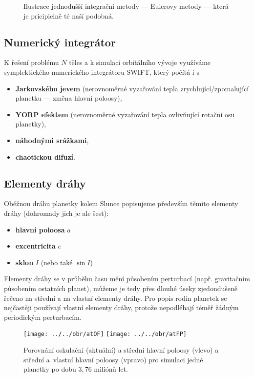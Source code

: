 \documentclass[a4paper, 12pt]{article}
\begin{document}
\begin{figure}
\begin{subfigure}[b]{0.45\textwidth}
	\end{subfigure}
	\caption{Ilustrace jednodušší integrační metody --- Eulerovy metody --- která je pricipielně té naší podobná.}
\end{figure}
\vspace{-1cm}
\subsection{Numerický integrátor}

K řešení problému $N$ těles a k simulaci orbitálního vývoje využíváme symplektického numerického integrátoru SWIFT, který počítá i s 

\begin{itemize}
\itemsep0em
\item \textbf{Jarkovského jevem} (nerovnoměrné vyzařování tepla zrychlující/zpomalující planetku --- změna hlavní poloosy),
\item \textbf{YORP efektem} (nerovnoměrné vyzařování tepla ovlivňující rotační osu planetky),
\item \textbf{náhodnými srážkami},
\item \textbf{chaotickou difuzí}.  
\end{itemize}

\subsection{Elementy dráhy}
Oběžnou dráhu planetky kolem Slunce popisujeme především těmito elementy dráhy (dohromady jich je ale šest):
\begin{itemize}
	\itemsep0em
	\item \textbf{hlavní poloosa} $a$
	\item \textbf{excentricita} $e$
	\item \textbf{sklon} $I$ (nebo také $\sin I$) 
\end{itemize}

Elementy dráhy se v průběhu času mění působením perturbací (např. gravitačním působením ostatních planet), můžeme je tedy přes dlouhé úseky zjedondušeně řečeno  na střední a na vlastní elementy dráhy. Pro popis rodin planetek se nejčastěji používají vlastní elementy dráhy, protože nepodléhají téměř žádným periodickým perturbacím.

\begin{figure}
	\centering
	\texttt{[image: ../../obr/atOF]}
	\texttt{[image: ../../obr/atFP]}
	\caption{Porovnání oskulační (aktuální) a střední hlavní poloosy (vlevo) a střední a~vlastní hlavní poloosy (vpravo) pro simulaci jedné planetky po dobu $3,76$ miliónů let.}
\end{figure}
\end{document}
